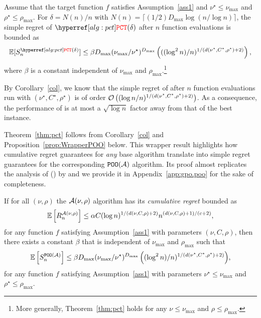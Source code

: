 \begin{theorem}\label{thm:pct}
Assume that the target function $f$ satisfies Assumption~\ref{ass1} and $\nu^\star \leq \nu_{\max}$ and $\rho^\star \leq \rho_{\max}$. For $\delta = N(n)/n$ with $N(n) = \lceil (1/2)D_{\max}\log(n/\log n)\rceil$, the simple regret of $\PCT(\delta)$ after $n$ function evaluations is bounded as
\[
	\mathbb{E}[S_n^{\PCT(\delta)}]  \leq \beta D_{\max}(\nu_{\max}/\nu^\star)^{D_{\max}} \left( ((\log^2 n)/n)^{1/(d(\nu^{\star},C^\star,\rho^{\star})+2)} \right),
\]
where $\beta$ is a constant independent of $\nu_{\max}$ and $\rho_{\max}$.\footnote{More generally, Theorem~\ref{thm:pct} holds for any $\nu \leq \nu_{\max}$ and $\rho \leq \rho_{\max}$.}
\end{theorem}
By Corollary~\ref{col}, we know that the simple regret of \HCT after $n$ function evaluations run with $(\nu^\star,C^\star,\rho^\star)$ is of order $\mathcal{O}\left( (\log n/n)^{1/(d(\nu^{\star},C^\star,\rho^{\star})+2)} \right)$. As a consequence, the performance of \PCT is at most a $\sqrt{\log n}$ factor away from that of the best \HCT instance.

Theorem~\ref{thm:pct} follows from Corollary~\ref{col} and Proposition~\ref{prop:WrapperPOO} below. This wrapper result highlights how cumulative regret guarantees for \emph{any} base algorithm translate into simple regret guarantees for the corresponding $\texttt{POO}(\mathcal{A})$ algorithm. Its proof almost replicates the analysis of \POO{}(\HOO) by \cite{grill2015poo} and we provide it in Appendix~\ref{app:gpo.poo} for the sake of completeness.  

\begin{proposition}\label{prop:WrapperPOO} If for all $(\nu,\rho)$ the $\mathcal{A}(\nu,\rho)$ algorithm has its \emph{cumulative regret} bounded as
\begin{equation}
    \mathbb{E}\left[R_n^{\mathcal{A}(\nu,\rho)}\right] \leq \alpha C(\log n)^{1/(d(\nu,C,\rho)+2)}n^{(d(\nu,C,\rho)+1)/(c+2)},\label{centralConditionPOO}
\end{equation}
for any function $f$ satisfying Assumption~\ref{ass1} with parameters $(\nu,C,\rho)$, then there exists a constant $\beta$ that is independent of $\nu_{\max}$ and $\rho_{\max}$ such that 
\[
    \mathbb{E}\left[S_n^{\texttt{POO}(\mathcal{A})}\right]  \leq \beta D_{\max}(\nu_{\max}/\nu^\star)^{D_{\max}} \left( (\log^2 n)/n)^{1/(d(\nu^\star,C^\star,\rho^\star)+2)} \right)\!,
\]
for any function $f$ satisfying Assumption~\ref{ass1} with parameters $\nu^\star \leq \nu_{\max}$ and $\rho^\star\leq \rho_{\max}$.
\end{proposition}
